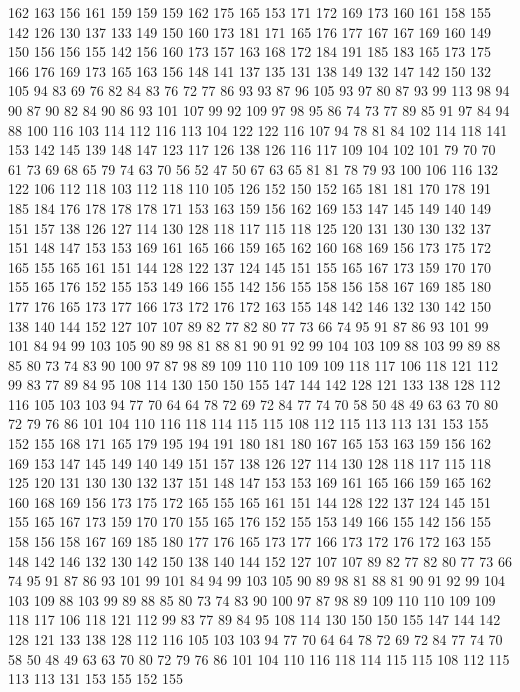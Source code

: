 162 163 156 161 159 159 159 162 175 165 153 171 172 169 173 160 161 158 155 142
126 130 137 133 149 150 160 173 181 171 165 176 177 167 167 169 160 149 150 156
156 155 142 156 160 173 157 163 168 172 184 191 185 183 165 173 175 166 176 169
173 165 163 156 148 141 137 135 131 138 149 132 147 142 150 132 105 94 83 69
76 82 84 83 76 72 77 86 93 93 87 96 105 93 97 80 87 93 99 113
98 94 90 87 90 82 84 90 86 93 101 107 99 92 109 97 98 95 86 74
73 77 89 85 91 97 84 94 88 100 116 103 114 112 116 113 104 122 122 116
107 94 78 81 84 102 114 118 141 153 142 145 139 148 147 123 117 126 138 126
116 117 109 104 102 101 79 70 70 61 73 69 68 65 79 74 63 70 56 52
47 50 67 63 65 81 81 78 79 93 100 106 116 132 122 106 112 118 103 112
118 110 105 126 152 150 152 165 181 181 170 178 191 185 184 176 178 178 178 171
153 163 159 156 162 169 153 147 145 149 140 149 151 157 138 126 127 114 130 128
118 117 115 118 125 120 131 130 130 132 137 151 148 147 153 153 169 161 165 166
159 165 162 160 168 169 156 173 175 172 165 155 165 161 151 144 128 122 137 124
145 151 155 165 167 173 159 170 170 155 165 176 152 155 153 149 166 155 142 156
155 158 156 158 167 169 185 180 177 176 165 173 177 166 173 172 176 172 163 155
148 142 146 132 130 142 150 138 140 144 152 127 107 107 89 82 77 82 80 77
73 66 74 95 91 87 86 93 101 99 101 84 94 99 103 105 90 89 98 81
88 81 90 91 92 99 104 103 109 88 103 99 89 88 85 80 73 74 83 90
100 97 87 98 89 109 110 110 109 109 118 117 106 118 121 112 99 83 77 89
84 95 108 114 130 150 150 155 147 144 142 128 121 133 138 128 112 116 105 103
103 94 77 70 64 64 78 72 69 72 84 77 74 70 58 50 48 49 63 63
70 80 72 79 76 86 101 104 110 116 118 114 115 115 108 112 115 113 113 131
153 155 152 155 168 171 165 179 195 194 191 180 181 180 167 165 153 163 159 156
162 169 153 147 145 149 140 149 151 157 138 126 127 114 130 128 118 117 115 118
125 120 131 130 130 132 137 151 148 147 153 153 169 161 165 166 159 165 162 160
168 169 156 173 175 172 165 155 165 161 151 144 128 122 137 124 145 151 155 165
167 173 159 170 170 155 165 176 152 155 153 149 166 155 142 156 155 158 156 158
167 169 185 180 177 176 165 173 177 166 173 172 176 172 163 155 148 142 146 132
130 142 150 138 140 144 152 127 107 107 89 82 77 82 80 77 73 66 74 95
91 87 86 93 101 99 101 84 94 99 103 105 90 89 98 81 88 81 90 91
92 99 104 103 109 88 103 99 89 88 85 80 73 74 83 90 100 97 87 98
89 109 110 110 109 109 118 117 106 118 121 112 99 83 77 89 84 95 108 114
130 150 150 155 147 144 142 128 121 133 138 128 112 116 105 103 103 94 77 70
64 64 78 72 69 72 84 77 74 70 58 50 48 49 63 63 70 80 72 79
76 86 101 104 110 116 118 114 115 115 108 112 115 113 113 131 153 155 152 155
